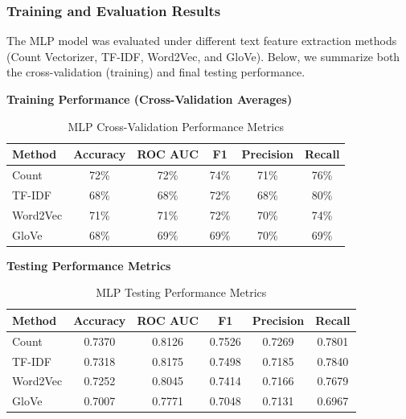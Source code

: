 \subsubsection{Training and Evaluation Results}

The MLP model was evaluated under different text feature extraction methods (Count Vectorizer, TF-IDF, Word2Vec, and GloVe). Below, we summarize both the cross-validation (training) and final testing performance.

\textbf{Training Performance (Cross-Validation Averages)}

\begin{table}[H]
    \centering
    \caption{MLP Cross-Validation Performance Metrics}
    \label{tab:mlp-training-metrics}
    \begin{tabular}{|l|c|c|c|c|c|}
        \hline
        \textbf{Method} & \textbf{Accuracy} & \textbf{ROC AUC} & \textbf{F1} & \textbf{Precision} & \textbf{Recall} \\
        \hline
        Count & 72\% & 72\% & 74\% & 71\% & 76\% \\
        \hline
        TF-IDF & 68\% & 68\% & 72\% & 68\% & 80\% \\
        \hline
        Word2Vec & 71\% & 71\% & 72\% & 70\% & 74\% \\
        \hline
        GloVe & 68\% & 69\% & 69\% & 70\% & 69\% \\
        \hline
    \end{tabular}
\end{table}

\textbf{Testing Performance Metrics}

\begin{table}[H]
    \centering
    \caption{MLP Testing Performance Metrics}
    \label{tab:mlp-testing-metrics}
    \begin{tabular}{|l|c|c|c|c|c|}
        \hline
        \textbf{Method} & \textbf{Accuracy} & \textbf{ROC AUC} & \textbf{F1} & \textbf{Precision} & \textbf{Recall} \\
        \hline
        Count & 0.7370 & 0.8126 & 0.7526 & 0.7269 & 0.7801 \\ 
        \hline
        TF-IDF & 0.7318 & 0.8175 & 0.7498 & 0.7185 & 0.7840 \\
        \hline
        Word2Vec & 0.7252 & 0.8045 & 0.7414 & 0.7166 & 0.7679 \\
        \hline
        GloVe & 0.7007 & 0.7771 & 0.7048 & 0.7131 & 0.6967 \\
        \hline
    \end{tabular}
\end{table}

